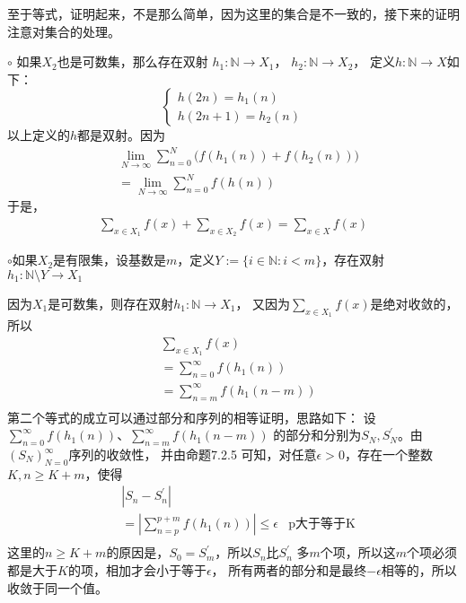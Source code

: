 \documentclass{article}
\begin{document}
\begin{itemize}
        至于等式，证明起来，不是那么简单，因为这里的集合是不一致的，接下来的证明注意对集合的处理。

        $\circ$ 如果$X_2$也是可数集，那么存在双射
        $h_1: \mathbb{N} \rightarrow X_1$，
        $h_2: \mathbb{N} \rightarrow X_2$，
        定义$h: \mathbb{N} \rightarrow X$如下：
        \begin{equation}
          \begin{cases*}
            h(2n) = h_1(n) \\
            h(2n+1) = h_2(n)
          \end{cases*}
        \end{equation}
        以上定义的$h$都是双射。因为
        \begin{align*}
           & \lim \limits_{N \rightarrow \infty} \sum \limits_{n=0}^N \big(f(h_1(n)) + f(h_2(n))\big) \\
           & = \lim \limits_{N \rightarrow \infty} \sum \limits_{n=0}^N  f(h(n))
        \end{align*}
        于是，
        \begin{align*}
          \sum \limits_{x \in X_1} f(x) + \sum \limits_{x \in X_2} f(x) = \sum \limits_{x \in X} f(x)
        \end{align*}

        $\circ$如果$X_2$是有限集，设基数是$m$，定义$Y := \{i \in \mathbb{N} : i < m\}$，存在双射
        $h_1: \mathbb{N} \setminus Y \rightarrow X_1$
        \begin{zremark}
          因为$X_1$是可数集，则存在双射$h_1: \mathbb{N} \rightarrow X_1$，
          又因为$\sum \limits_{x \in X_1} f(x) $是绝对收敛的，所以
          \begin{align*}
             & \sum \limits_{x \in X_1} f(x)           \\
             & = \sum \limits_{n=0}^\infty f(h_1(n))   \\
             & = \sum \limits_{n=m}^\infty f(h_1(n-m)) \\
          \end{align*}
          第二个等式的成立可以通过部分和序列的相等证明，思路如下：
          设$\sum \limits_{n=0}^\infty f(h_1(n))$、$\sum \limits_{n=m}^\infty f(h_1(n-m))$
          的部分和分别为$S_N, S_{N}^\prime$。由$(S_N)_{N=0}^\infty$序列的收敛性，
          并由命题7.2.5 可知，对任意$\epsilon > 0$，存在一个整数$K, n \geq K+m$，使得
          \begin{align*}
             & |S_n - S_{n}^\prime|                                                 \\
             & = |\sum \limits_{n=p}^{p+m} f(h_1(n))| \leq \epsilon & \text{p大于等于K} \\
          \end{align*}
          这里的$n \geq K + m$的原因是，$S_0 = S_m^\prime$，所以$S_n$比$S_n^\prime$
          多$m$个项，所以这$m$个项必须都是大于$K$的项，相加才会小于等于$\epsilon$，
          所有两者的部分和是最终$-\epsilon$相等的，所以收敛于同一个值。
        \end{zremark}


\end{itemize}
\end{document}

